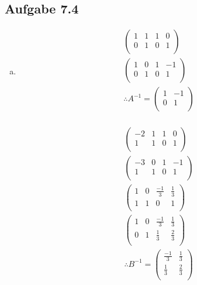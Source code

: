 \documentclass{standalone}
\begin{document}
\subsection{Aufgabe 7.4}
\begin{enumerate}[a)]
\item
    \begin{align*}
        \left(\begin{array}{rr|rr}
        1 & 1 & 1 & 0 \\
        0 & 1 & 0 & 1 \\
        \end{array}\right) \\
        \left(\begin{array}{rr|rr}
        1 & 0 & 1 & -1 \\
        0 & 1 & 0 & 1 \\
        \end{array}\right) \\
        \therefore A^{-1} = \left(\begin{array}{rr}
        1 & -1 \\
        0 & 1 \\
        \end{array}\right) \\
    \end{align*}

    \begin{align*}
        \left(\begin{array}{rr|rr}
        -2 & 1 & 1 & 0 \\
        1 & 1 & 0 & 1 \\
        \end{array}\right) \\
        \left(\begin{array}{rr|rr}
        -3 & 0 & 1 & -1 \\
        1 & 1 & 0 & 1 \\
        \end{array}\right) \\
        \left(\begin{array}{rr|rr}
        1 & 0 & \frac{-1}{3} & \frac{1}{3} \\
        1 & 1 & 0 & 1 \\
        \end{array}\right) \\
        \left(\begin{array}{rr|rr}
        1 & 0 & \frac{-1}{3} & \frac{1}{3} \\
        0 & 1 & \frac{1}{3} & \frac{2}{3} \\
        \end{array}\right) \\
        \therefore B^{-1} = \left(\begin{array}{rr}
        \frac{-1}{3} & \frac{1}{3} \\
        \frac{1}{3} & \frac{2}{3} \\
        \end{array}\right) \\
    \end{align*}


\end{enumerate}
\end{document}
